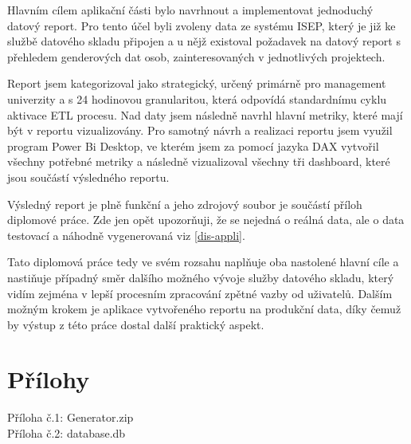\documentclass[
  digital,     %
  twoside,     %
  lof,         %
  lot,         %
]{fithesis4}
\begin{document}
Hlavním cílem aplikační části bylo navrhnout a implementovat jednoduchý datový report. Pro tento účel byli zvoleny data ze systému ISEP, který je již ke službě datového skladu připojen a u nějž existoval požadavek na datový report s přehledem genderových dat osob, zainteresovaných v jednotlivých projektech. 

Report jsem kategorizoval jako strategický, určený primárně pro management univerzity a s 24 hodinovou granularitou, která odpovídá standardnímu cyklu aktivace ETL procesu. 
Nad daty jsem následně navrhl hlavní metriky, které mají být v reportu vizualizovány. Pro samotný návrh a realizaci reportu jsem využil program Power Bi Desktop, ve kterém jsem za pomocí jazyka DAX vytvořil všechny potřebné metriky a následně vizualizoval všechny tři dashboard, které jsou součástí výsledného reportu. 

Výsledný report je plně funkční a jeho zdrojový soubor je součástí příloh diplomové práce. Zde jen opět upozorňuji, že se nejedná o reálná data, ale o data testovací a náhodně vygenerovaná viz \ref{dis-appli}.

Tato diplomová práce tedy ve svém rozsahu naplňuje oba nastolené hlavní cíle a nastiňuje případný směr dalšího možného vývoje služby datového skladu, který vidím zejména v lepší procesním zpracování zpětné vazby od uživatelů. Dalším možným krokem je aplikace vytvořeného reportu na produkční data, díky čemuž by výstup z této práce dostal další praktický aspekt. 

\printbibliography[heading=bibintoc] %

  \makeatletter\thesis@blocks@clear\makeatother
  \printindex

\appendix %
\chapter{Přílohy}
Příloha č.1: Generator.zip\\Příloha č.2: database.db
\end{document}
